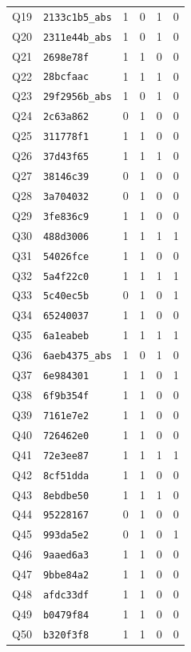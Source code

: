 \begin{longtable}{@{}clcccc@{}}
Q19 & \texttt{2133c1b5\_abs} & 1 & 0 & 1 & 0 \\
Q20 & \texttt{2311e44b\_abs} & 1 & 0 & 1 & 0 \\
Q21 & \texttt{2698e78f} & 1 & 1 & 0 & 0 \\
Q22 & \texttt{28bcfaac} & 1 & 1 & 1 & 0 \\
Q23 & \texttt{29f2956b\_abs} & 1 & 0 & 1 & 0 \\
Q24 & \texttt{2c63a862} & 0 & 1 & 0 & 0 \\
Q25 & \texttt{311778f1} & 1 & 1 & 0 & 0 \\
Q26 & \texttt{37d43f65} & 1 & 1 & 1 & 0 \\
Q27 & \texttt{38146c39} & 0 & 1 & 0 & 0 \\
Q28 & \texttt{3a704032} & 0 & 1 & 0 & 0 \\
Q29 & \texttt{3fe836c9} & 1 & 1 & 0 & 0 \\
Q30 & \texttt{488d3006} & 1 & 1 & 1 & 1 \\
Q31 & \texttt{54026fce} & 1 & 1 & 0 & 0 \\
Q32 & \texttt{5a4f22c0} & 1 & 1 & 1 & 1 \\
Q33 & \texttt{5c40ec5b} & 0 & 1 & 0 & 1 \\
Q34 & \texttt{65240037} & 1 & 1 & 0 & 0 \\
Q35 & \texttt{6a1eabeb} & 1 & 1 & 1 & 1 \\
Q36 & \texttt{6aeb4375\_abs} & 1 & 0 & 1 & 0 \\
Q37 & \texttt{6e984301} & 1 & 1 & 0 & 1 \\
Q38 & \texttt{6f9b354f} & 1 & 1 & 0 & 0 \\
Q39 & \texttt{7161e7e2} & 1 & 1 & 0 & 0 \\
Q40 & \texttt{726462e0} & 1 & 1 & 0 & 0 \\
Q41 & \texttt{72e3ee87} & 1 & 1 & 1 & 1 \\
Q42 & \texttt{8cf51dda} & 1 & 1 & 0 & 0 \\
Q43 & \texttt{8ebdbe50} & 1 & 1 & 1 & 0 \\
Q44 & \texttt{95228167} & 0 & 1 & 0 & 0 \\
Q45 & \texttt{993da5e2} & 0 & 1 & 0 & 1 \\
Q46 & \texttt{9aaed6a3} & 1 & 1 & 0 & 0 \\
Q47 & \texttt{9bbe84a2} & 1 & 1 & 0 & 0 \\
Q48 & \texttt{afdc33df} & 1 & 1 & 0 & 0 \\
Q49 & \texttt{b0479f84} & 1 & 1 & 0 & 0 \\
Q50 & \texttt{b320f3f8} & 1 & 1 & 0 & 0 \\

\end{longtable}
